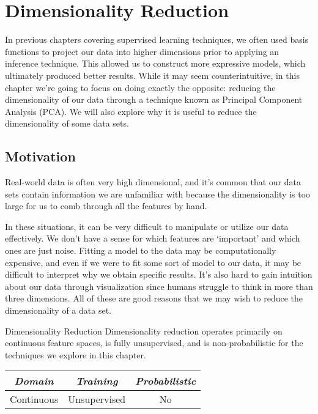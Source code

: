 \chapter{Dimensionality Reduction}
In previous chapters covering supervised learning techniques, we often used basis functions to project our data into higher dimensions prior to applying an inference technique. This allowed us to construct more expressive models, which ultimately produced better results. While it may seem counterintuitive, in this chapter we're going to focus on doing exactly the opposite: reducing the dimensionality of our data through a technique known as Principal Component Analysis (PCA). We will also explore why it is useful to reduce the dimensionality of some data sets.

\section{Motivation}
Real-world data is often very high dimensional, and it's common that our data sets contain information we are unfamiliar with because the dimensionality is too large for us to comb through all the features by hand.

In these situations, it can be very difficult to manipulate or utilize our data effectively. We don't have a sense for which features are `important' and which ones are just noise. Fitting a model to the data may be computationally expensive, and even if we were to fit some sort of model to our data, it may be difficult to interpret why we obtain specific results. It's also hard to gain intuition about our data through visualization since humans struggle to think in more than three dimensions. All of these are good reasons that we may wish to reduce the dimensionality of a data set.

\begin{mlcube}{Dimensionality Reduction}
Dimensionality reduction operates primarily on continuous feature spaces, is fully unsupervised, and is non-probabilistic for the techniques we explore in this chapter.
\begin{center}
    \begin{tabular}{c|c|c}
    \textit{\textbf{Domain}} & \textit{\textbf{Training}} & \textit{\textbf{Probabilistic}} \\
    \hline
    Continuous & Unsupervised & No \\
    \end{tabular}
\end{center}
\end{mlcube}

